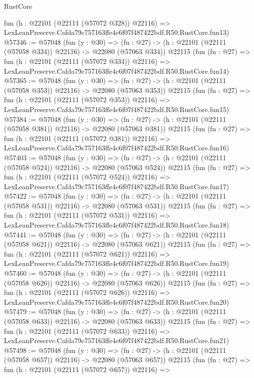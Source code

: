 \begin{lexlean}{RustCore}
\begin{coremodule}
    fun (h : @22101 (@22111 (@57072 @328)) @22116) =>
    LexLeanPreserve.Cafda79c757163ffe4c6f07f487422bdf.R50.RustCore.fun13)
@57346 := @57048
    (fun (y : @30) =>
    (fn : @27) -> (h : @22101 (@22111 (@57058 @334)) @22116) -> @22080 (@57063 @334))
    @22115
    (fun (fn : @27) =>
    fun (h : @22101 (@22111 (@57072 @334)) @22116) =>
    LexLeanPreserve.Cafda79c757163ffe4c6f07f487422bdf.R50.RustCore.fun14)
@57365 := @57048
    (fun (y : @30) =>
    (fn : @27) -> (h : @22101 (@22111 (@57058 @353)) @22116) -> @22080 (@57063 @353))
    @22115
    (fun (fn : @27) =>
    fun (h : @22101 (@22111 (@57072 @353)) @22116) =>
    LexLeanPreserve.Cafda79c757163ffe4c6f07f487422bdf.R50.RustCore.fun15)
@57384 := @57048
    (fun (y : @30) =>
    (fn : @27) -> (h : @22101 (@22111 (@57058 @381)) @22116) -> @22080 (@57063 @381))
    @22115
    (fun (fn : @27) =>
    fun (h : @22101 (@22111 (@57072 @381)) @22116) =>
    LexLeanPreserve.Cafda79c757163ffe4c6f07f487422bdf.R50.RustCore.fun16)
@57403 := @57048
    (fun (y : @30) =>
    (fn : @27) -> (h : @22101 (@22111 (@57058 @524)) @22116) -> @22080 (@57063 @524))
    @22115
    (fun (fn : @27) =>
    fun (h : @22101 (@22111 (@57072 @524)) @22116) =>
    LexLeanPreserve.Cafda79c757163ffe4c6f07f487422bdf.R50.RustCore.fun17)
@57422 := @57048
    (fun (y : @30) =>
    (fn : @27) -> (h : @22101 (@22111 (@57058 @531)) @22116) -> @22080 (@57063 @531))
    @22115
    (fun (fn : @27) =>
    fun (h : @22101 (@22111 (@57072 @531)) @22116) =>
    LexLeanPreserve.Cafda79c757163ffe4c6f07f487422bdf.R50.RustCore.fun18)
@57441 := @57048
    (fun (y : @30) =>
    (fn : @27) -> (h : @22101 (@22111 (@57058 @621)) @22116) -> @22080 (@57063 @621))
    @22115
    (fun (fn : @27) =>
    fun (h : @22101 (@22111 (@57072 @621)) @22116) =>
    LexLeanPreserve.Cafda79c757163ffe4c6f07f487422bdf.R50.RustCore.fun19)
@57460 := @57048
    (fun (y : @30) =>
    (fn : @27) -> (h : @22101 (@22111 (@57058 @626)) @22116) -> @22080 (@57063 @626))
    @22115
    (fun (fn : @27) =>
    fun (h : @22101 (@22111 (@57072 @626)) @22116) =>
    LexLeanPreserve.Cafda79c757163ffe4c6f07f487422bdf.R50.RustCore.fun20)
@57479 := @57048
    (fun (y : @30) =>
    (fn : @27) -> (h : @22101 (@22111 (@57058 @633)) @22116) -> @22080 (@57063 @633))
    @22115
    (fun (fn : @27) =>
    fun (h : @22101 (@22111 (@57072 @633)) @22116) =>
    LexLeanPreserve.Cafda79c757163ffe4c6f07f487422bdf.R50.RustCore.fun21)
@57498 := @57048
    (fun (y : @30) =>
    (fn : @27) -> (h : @22101 (@22111 (@57058 @657)) @22116) -> @22080 (@57063 @657))
    @22115
    (fun (fn : @27) =>
    fun (h : @22101 (@22111 (@57072 @657)) @22116) =>

\end{coremodule}
\end{lexlean}
